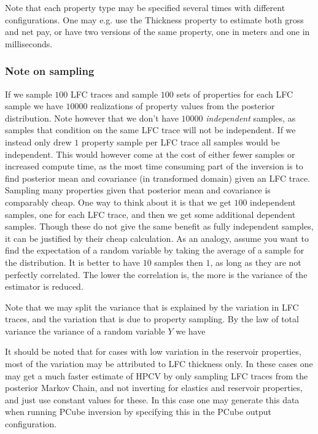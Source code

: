 \documentclass[note,screen,english,12pt,utf8]{nrdoc}
\begin{document}
Note that each property type may be specified several times with different configurations.
One may e.g. use the Thickness property to estimate both gross and net pay,
or have two versions of the same property, one in meters and one in milliseconds.

\subsubsection{Note on sampling}
\label{sec:sampling}

If we sample $100$ LFC traces and sample $100$ sets of properties for each
LFC sample we have $10000$ realizations of property values from the posterior distribution.
Note however that we don't have $10000$
\textit{independent} samples, as samples that condition on the same LFC
trace will not be independent. If we instead only drew $1$ property sample per LFC trace
all samples would be independent. This would however come at the cost of either fewer
samples or increased compute time, as the most time consuming part of the inversion
is to find posterior mean and covariance (in transformed domain) given an LFC trace.
Sampling many properties given that posterior mean and covariance is comparably cheap.
One way to think about it is that we get $100$ independent samples, one for each LFC trace, and then we
get some additional dependent samples. Though these do not give the same benefit
as fully independent samples, it can be justified by their cheap calculation.
As an analogy, assume you want to find the expectation of a random variable by taking
the average of a sample for the distribution. It is better to have $10$ samples then
$1$, as long as they are not perfectly correlated. The lower the correlation is, the
more is the variance of the estimator is reduced.

Note that we may split the variance that is explained by the variation in LFC traces,
and the variation that is due to property sampling. By the law of total variance
the variance of a random variable $Y$ we have

It should be noted that for cases with low variation in the reservoir properties,
most of the variation may be attributed to LFC thickness only. In these cases one may get
a much faster estimate of HPCV by only sampling LFC traces from the posterior Markov Chain,
and not inverting for elastics and reservoir properties, and just use constant values for these.
In this case one may generate this data when running PCube inversion by specifying this
in the PCube output configuration.
\end{document}
